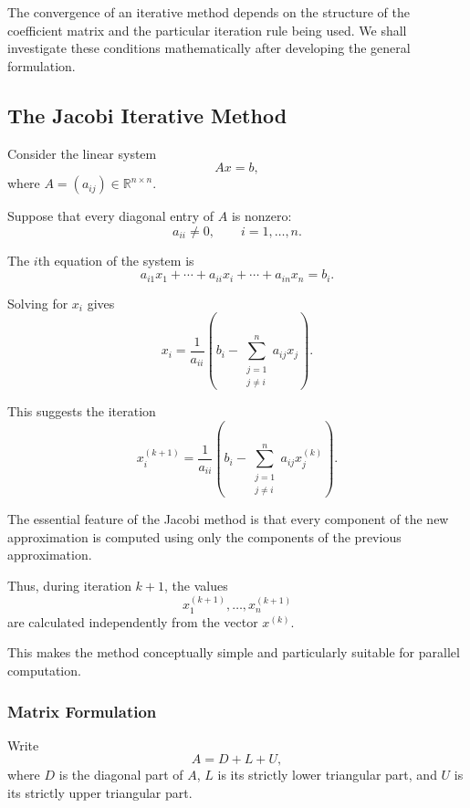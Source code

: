 \documentclass[11pt,a4paper]{article}
\theoremstyle{definition}
\theoremstyle{remark}
\begin{document}
The convergence of an iterative method depends on
the structure of the coefficient matrix and the
particular iteration rule being used. We shall
investigate these conditions mathematically after
developing the general formulation.


\subsection{The Jacobi Iterative Method}

Consider the linear system
\begin{equation}
    Ax=b,
    \label{eq:general_system}
\end{equation}
where $A=(a_{ij})\in\mathbb{R}^{n\times n}$.

Suppose that every diagonal entry of $A$ is nonzero:
\[
    a_{ii}\neq0,
    \qquad i=1,\ldots,n.
\]

The $i$th equation of the system is
\[
    a_{i1}x_1+\cdots+a_{ii}x_i
    +\cdots+a_{in}x_n=b_i.
\]

Solving for $x_i$ gives
\[
    x_i=
    \frac{1}{a_{ii}}
    \left(
        b_i-\sum_{\substack{j=1\\j\neq i}}^n
        a_{ij}x_j
    \right).
\]

This suggests the iteration
\begin{equation}
    \boxed{
    x_i^{(k+1)}
    =
    \frac{1}{a_{ii}}
    \left(
        b_i-
        \sum_{\substack{j=1\\j\neq i}}^n
        a_{ij}x_j^{(k)}
    \right).
    }
    \label{eq:jacobi_component}
\end{equation}

The essential feature of the Jacobi method is that
every component of the new approximation is computed
using only the components of the previous approximation.

Thus, during iteration $k+1$, the values
\[
    x_1^{(k+1)},\ldots,x_n^{(k+1)}
\]
are calculated independently from the vector $x^{(k)}$.

This makes the method conceptually simple and
particularly suitable for parallel computation.

\subsubsection*{Matrix Formulation}

Write
\[
    A=D+L+U,
\]
where $D$ is the diagonal part of $A$, $L$ is its
strictly lower triangular part, and $U$ is its
strictly upper triangular part.
\end{document}
